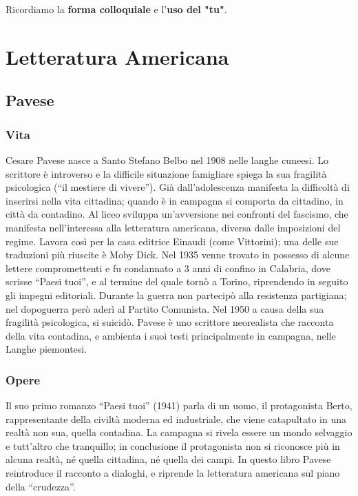 \documentclass[12pt]{report}
\begin{document}
		Ricordiamo la \textbf{forma colloquiale} e l'\textbf{uso del "tu"}.
	
	\chapter{Letteratura Americana}
	
		\section{Pavese}
		\subsection[Vita]{Vita}
		Cesare Pavese nasce a Santo Stefano Belbo nel 1908 nelle langhe cuneesi. Lo scrittore è introverso e la difficile situazione famigliare spiega la sua fragilità psicologica (“il mestiere di vivere”). Già dall’adolescenza manifesta la difficoltà di inserirsi nella vita cittadina; quando è in campagna si comporta da cittadino, in città da contadino. 
		Al liceo sviluppa un’avversione nei confronti del fascismo, che manifesta nell’interessa alla letteratura americana, diversa dalle imposizioni del regime. Lavora così per la casa editrice Einaudi (come Vittorini); una delle sue traduzioni più riuscite è Moby Dick. Nel 1935 venne trovato in possesso di alcune lettere compromettenti e fu condannato a 3 anni di confino in Calabria, dove scrisse “Paesi tuoi”, e al termine del quale tornò a Torino, riprendendo in seguito gli impegni editoriali. Durante la guerra non partecipò alla resistenza partigiana; nel dopoguerra però aderì al Partito Comunista. Nel 1950 a causa della sua fragilità psicologica, si suicidò.
		Pavese è uno scrittore neorealista che racconta della vita contadina, e ambienta i suoi testi principalmente in campagna, nelle Langhe piemontesi. 
		
		\subsection[Opere]{Opere}	
		Il suo primo romanzo “Paesi tuoi” (1941) parla di un uomo, il protagonista Berto, rappresentante della civiltà moderna ed industriale, che viene catapultato in una realtà non sua, quella contadina. La campagna si rivela essere un mondo selvaggio e tutt’altro che tranquillo; in conclusione il protagonista non si riconosce più in alcuna realtà, né quella cittadina, né quella dei campi. In questo libro Pavese reintroduce il racconto a dialoghi, e riprende la letteratura americana sul piano della “crudezza”.
		
\end{document}
